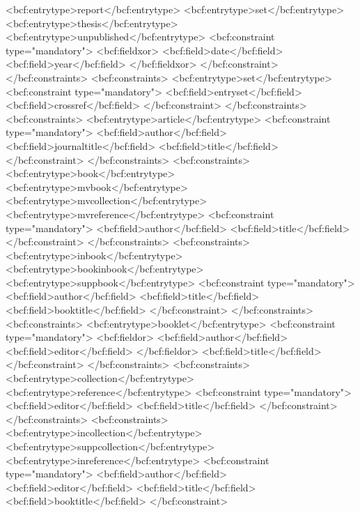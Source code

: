       <bcf:entrytype>report</bcf:entrytype>
      <bcf:entrytype>set</bcf:entrytype>
      <bcf:entrytype>thesis</bcf:entrytype>
      <bcf:entrytype>unpublished</bcf:entrytype>
      <bcf:constraint type="mandatory">
        <bcf:fieldxor>
          <bcf:field>date</bcf:field>
          <bcf:field>year</bcf:field>
        </bcf:fieldxor>
      </bcf:constraint>
    </bcf:constraints>
    <bcf:constraints>
      <bcf:entrytype>set</bcf:entrytype>
      <bcf:constraint type="mandatory">
        <bcf:field>entryset</bcf:field>
        <bcf:field>crossref</bcf:field>
      </bcf:constraint>
    </bcf:constraints>
    <bcf:constraints>
      <bcf:entrytype>article</bcf:entrytype>
      <bcf:constraint type="mandatory">
        <bcf:field>author</bcf:field>
        <bcf:field>journaltitle</bcf:field>
        <bcf:field>title</bcf:field>
      </bcf:constraint>
    </bcf:constraints>
    <bcf:constraints>
      <bcf:entrytype>book</bcf:entrytype>
      <bcf:entrytype>mvbook</bcf:entrytype>
      <bcf:entrytype>mvcollection</bcf:entrytype>
      <bcf:entrytype>mvreference</bcf:entrytype>
      <bcf:constraint type="mandatory">
        <bcf:field>author</bcf:field>
        <bcf:field>title</bcf:field>
      </bcf:constraint>
    </bcf:constraints>
    <bcf:constraints>
      <bcf:entrytype>inbook</bcf:entrytype>
      <bcf:entrytype>bookinbook</bcf:entrytype>
      <bcf:entrytype>suppbook</bcf:entrytype>
      <bcf:constraint type="mandatory">
        <bcf:field>author</bcf:field>
        <bcf:field>title</bcf:field>
        <bcf:field>booktitle</bcf:field>
      </bcf:constraint>
    </bcf:constraints>
    <bcf:constraints>
      <bcf:entrytype>booklet</bcf:entrytype>
      <bcf:constraint type="mandatory">
        <bcf:fieldor>
          <bcf:field>author</bcf:field>
          <bcf:field>editor</bcf:field>
        </bcf:fieldor>
        <bcf:field>title</bcf:field>
      </bcf:constraint>
    </bcf:constraints>
    <bcf:constraints>
      <bcf:entrytype>collection</bcf:entrytype>
      <bcf:entrytype>reference</bcf:entrytype>
      <bcf:constraint type="mandatory">
        <bcf:field>editor</bcf:field>
        <bcf:field>title</bcf:field>
      </bcf:constraint>
    </bcf:constraints>
    <bcf:constraints>
      <bcf:entrytype>incollection</bcf:entrytype>
      <bcf:entrytype>suppcollection</bcf:entrytype>
      <bcf:entrytype>inreference</bcf:entrytype>
      <bcf:constraint type="mandatory">
        <bcf:field>author</bcf:field>
        <bcf:field>editor</bcf:field>
        <bcf:field>title</bcf:field>
        <bcf:field>booktitle</bcf:field>
      </bcf:constraint>
